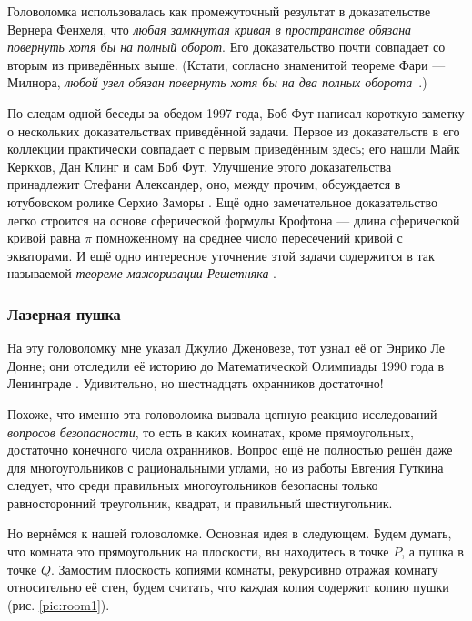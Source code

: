 \begin{addedbytheeditors}
Головоломка использовалась как промежуточный результат \cite[Satz I$'$]{fenchel}
в доказательстве Вернера Фенхеля, что \emph{любая замкнутая кривая в пространстве обязана повернуть хотя бы на полный оборот}.
Его доказательство почти совпадает со вторым из приведённых выше.
(Кстати, согласно знаменитой теореме Фари --- Милнора, \emph{любой узел обязан повернуть хотя бы на два полных оборота}~\cite{petrunin-stadler}.)

По следам одной беседы за обедом 1997 года, Боб Фут написал короткую заметку о нескольких доказательствах приведённой задачи.
Первое из доказательств в его коллекции практически совпадает с первым приведённым здесь;
его нашли Майк Керкхов, Дан Клинг и сам Боб Фут.
Улучшение этого доказательства принадлежит Стефани Александер, оно, между прочим, обсуждается в ютубовском ролике Серхио Заморы \cite{zamora}.
Ещё одно замечательное доказательство легко строится на основе сферической формулы Крофтона --- длина сферической кривой равна $\pi$ помноженному на среднее число пересечений кривой с экваторами.
И ещё одно интересное уточнение этой задачи содержится в так называемой \emph{теореме мажоризации Решетняка} \cite{reshetnyak}.
\end{addedbytheeditors}

\subsubsection*{Лазерная пушка}

На эту головоломку мне указал Джулио Дженовезе, тот узнал её от Энрико Ле Донне;
они отследили её историю до Математической Олимпиады 1990 года в Ленинграде \cite{17}.
Удивительно, но шестнадцать охранников достаточно!

Похоже, что именно эта головоломка вызвала цепную реакцию исследований \emph{вопросов безопасности}, то есть в каких комнатах, кроме прямоугольных, достаточно конечного числа охранников.
Вопрос ещё не полностью решён даже для многоугольников с рациональными углами, но из работы Евгения Гуткина \cite{34} следует, что среди правильных многоугольников безопасны только равносторонний треугольник, квадрат, и правильный шестиугольник.

Но вернёмся к нашей головоломке.
Основная идея в следующем.
Будем думать, что комната это прямоугольник на плоскости, вы находитесь в точке $P$, а пушка в точке $Q$.
Замостим плоскость копиями комнаты, рекурсивно отражая комнату относительно её стен, будем считать, что каждая копия содержит копию пушки (рис. \ref{pic:room1}).

